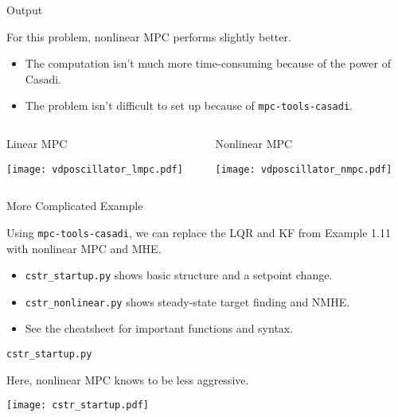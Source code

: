 \documentclass[xcolor=dvipsnames]{beamer}
\begin{document}
\begin{frame}{Output}

For this problem, nonlinear MPC performs slightly better.
\begin{itemize}
    \item The computation isn't much more time-consuming because of the power of Casadi.
    \item The problem isn't difficult to set up because of \texttt{mpc-tools-casadi}.
\end{itemize}
    
\begin{columns}
    \begin{column}{.475\textwidth}
        \begin{block}{Linear MPC}
            \begin{center}
                \texttt{[image: vdposcillator\_lmpc.pdf]}
            \end{center}
        \end{block}
    \end{column}
    \begin{column}{.475\textwidth}
        \begin{block}{Nonlinear MPC}
            \begin{center}
                \texttt{[image: vdposcillator\_nmpc.pdf]}
            \end{center}
        \end{block}
    \end{column}
\end{columns}
\end{frame}

\begin{frame}{More Complicated Example}

Using \texttt{mpc-tools-casadi}, we can replace the LQR and KF from Example 1.11 with nonlinear MPC and MHE.

\begin{itemize}
    \item \texttt{cstr\_startup.py} shows basic structure and a setpoint change.
    \item \texttt{cstr\_nonlinear.py} shows steady-state target finding and NMHE.
    \item See the cheatsheet for important functions and syntax.
\end{itemize}

\end{frame}

\begin{frame}{\texttt{cstr\_startup.py}}
    
    Here, nonlinear MPC knows to be less aggressive.
    \begin{center}
        \texttt{[image: cstr\_startup.pdf]}
     \end{center}
\end{frame}
\end{document}
